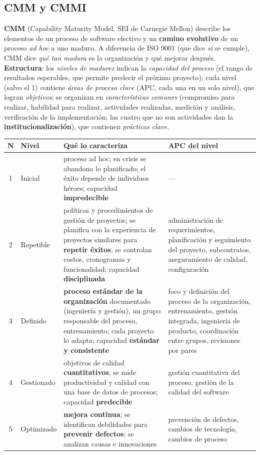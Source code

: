 \documentclass[11pt,a4paper]{article}
\begin{document}
\subsection{CMM y CMMI}
\textbf{CMM} (Capability Maturity Model, SEI de Carnegie Mellon) describe los elementos de un proceso de
software efectivo y un \textbf{camino evolutivo} de un proceso \emph{ad hoc} a uno maduro. A diferencia de ISO
9001 (que dice \emph{si} se cumple), CMM dice \emph{qué tan madura} es la organización y qué mejorar después.
\textbf{Estructura}: los \emph{niveles de madurez} indican la \emph{capacidad del proceso} (el rango de
resultados esperables, que permite predecir el próximo proyecto); cada nivel (salvo el 1) contiene \emph{áreas de
proceso clave} (APC, cada una en un solo nivel), que logran \emph{objetivos}; se organizan en \emph{características
comunes} (compromiso para realizar, habilidad para realizar, actividades realizadas, medición y análisis,
verificación de la implementación; las cuatro que no son actividades dan la \textbf{institucionalización}), que
contienen \emph{prácticas clave}.
\begin{center}\small
\begin{tabularx}{\textwidth}{@{}c l X X@{}}
\toprule
\textbf{N} & \textbf{Nivel} & \textbf{Qué lo caracteriza} & \textbf{APC del nivel}\\
\midrule
1 & Inicial & proceso ad hoc; en crisis se abandona lo planificado; el éxito depende de individuos héroes;
capacidad \textbf{impredecible} & ---\\
2 & Repetible & políticas y procedimientos de gestión de proyectos; se planifica con la experiencia de proyectos
similares para \textbf{repetir éxitos}; se controlan costos, cronogramas y funcionalidad; capacidad
\textbf{disciplinada} & administración de requerimientos, planificación y seguimiento del proyecto, subcontratos,
aseguramiento de calidad, configuración\\
3 & Definido & \textbf{proceso estándar de la organización} documentado (ingeniería y gestión), un grupo
responsable del proceso, entrenamiento; cada proyecto lo adapta; capacidad \textbf{estándar y consistente} &
foco y definición del proceso de la organización, entrenamiento, gestión integrada, ingeniería de producto,
coordinación entre grupos, revisiones por pares\\
4 & Gestionado & objetivos de calidad \textbf{cuantitativos}; se mide productividad y calidad con una base de
datos de procesos; capacidad \textbf{predecible} & gestión cuantitativa del proceso, gestión de la calidad del
software\\
5 & Optimizado & \textbf{mejora continua}; se identifican debilidades para \textbf{prevenir defectos}; se
analizan causas e innovaciones & prevención de defectos, cambios de tecnología, cambios de proceso\\
\bottomrule
\end{tabularx}
\end{center}
\end{document}

